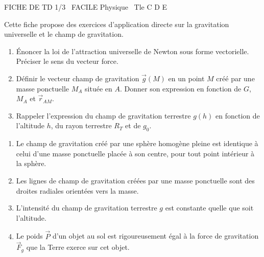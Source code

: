 \documentclass[11pt]{article}
\begin{document}
\begin{tcolorbox}[enhanced,colback=popink,colframe=popink,arc=10pt,boxrule=0pt,left=12pt,right=12pt,top=9pt,bottom=9pt]
{\color{white}\popxbold\small FICHE DE TD 1/3 \textbullet\ FACILE \hfill Physique \textbullet\ Tle C D E\par}
\end{tcolorbox}
\vspace{4pt}
Cette fiche propose des exercices d'application directe sur la gravitation universelle et le champ de gravitation.

\begin{exercice}
\begin{enumerate}
    \item Énoncer la loi de l'attraction universelle de Newton sous forme vectorielle. Préciser le sens du vecteur force.
    \item Définir le vecteur champ de gravitation $\vec{g}(M)$ en un point $M$ créé par une masse ponctuelle $M_A$ située en $A$. Donner son expression en fonction de $G$, $M_A$ et $\vec{r}_{AM}$.
    \item Rappeler l'expression du champ de gravitation terrestre $g(h)$ en fonction de l'altitude $h$, du rayon terrestre $R_T$ et de $g_0$.
\end{enumerate}
\end{exercice}

\begin{exercice}
\begin{enumerate}
    \item Le champ de gravitation créé par une sphère homogène pleine est identique à celui d'une masse ponctuelle placée à son centre, pour tout point intérieur à la sphère.
    \item Les lignes de champ de gravitation créées par une masse ponctuelle sont des droites radiales orientées vers la masse.
    \item L'intensité du champ de gravitation terrestre $g$ est constante quelle que soit l'altitude.
    \item Le poids $\vec{P}$ d'un objet au sol est rigoureusement égal à la force de gravitation $\vec{F}_g$ que la Terre exerce sur cet objet.
\end{enumerate}
\end{exercice}
\end{document}
